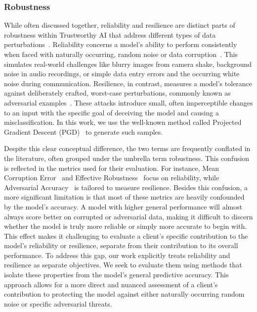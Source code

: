 \documentclass[acmsmall]{acmart}
\begin{document}
\subsubsection*{Robustness}

While often discussed together, reliability and resilience are distinct parts of robustness within Trustworthy AI that address different types of data perturbations~\cite{fawzi2016robustness}. Reliability concerns a model's ability to perform consistently when faced with naturally occurring, random noise or data corruption~\cite{shannon1948}. This simulates real-world challenges like blurry images from camera shake, background noise in audio recordings, or simple data entry errors and the occurring white noise during communication. Resilience, in contrast, measures a model's tolerance against deliberately crafted, worst-case perturbations, commonly known as adversarial examples~\cite{goodfellow2014explaining}. These attacks introduce small, often imperceptible changes to an input with the specific goal of deceiving the model and causing a misclassification. In this work, we use the well-known method called Projected Gradient Descent (PGD)~\cite{madry2017towards} to generate such samples.

Despite this clear conceptual difference, the two terms are frequently conflated in the literature, often grouped under the umbrella term robustness. This confusion is reflected in the metrics used for their evaluation. For instance, Mean Corruption Error~\cite{mCE} and Effective Robustness~\cite{effectiverelative} focus on reliability, while Adversarial Accuracy~\cite{23metric} is tailored to measure resilience. Besides this confusion, a more significant limitation is that most of these metrics are heavily confounded by the model's accuracy. A model with higher general performance will almost always score better on corrupted or adversarial data, making it difficult to discern whether the model is truly more reliable or simply more accurate to begin with. This effect makes it challenging to evaluate a client's specific contribution to the model's reliability or resilience, separate from their contribution to its overall performance. To address this gap, our work explicitly treats reliability and resilience as separate objectives. We seek to evaluate them using methods that isolate these properties from the model's general predictive accuracy. This approach allows for a more direct and nuanced assessment of a client's contribution to protecting the model against either naturally occurring random noise or specific adversarial threats.
\end{document}

